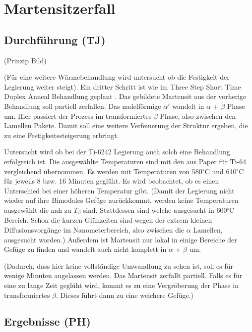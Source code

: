 \chapter{Martensitzerfall}

\section{Durchführung (TJ)}

(Prinzip Bild)


(Für eine weitere Wärmebehandlung wird untersucht ob die Festigkeit der Legierung weiter steigt). Ein dritter Schritt ist wie im Three Step Short Time Duplex Anneal Behandlung geplant \cite{Morita.2005}. Das gebildete Martensit aus der vorherige Behandlung soll partiell zerfallen. Das nadelförmige $\alpha'$ wandelt in $\alpha$ + $\beta$ Phase um. Hier passiert der Prozess im transformiertes $\beta$ Phase, also zwischen den Lamellen Pakete. Damit soll eine weitere Verfeinerung der Struktur ergeben, die zu eine Festigkeitssteigerung erbringt.

Untersucht wird ob bei der Ti-6242 Legierung auch solch eine Behandlung erfolgreich ist. Die ausgewählte Temperaturen sind mit den aus  Paper für Ti-64 \cite{Morita.2005} vergleichend übernommen. Es werden mit Temperaturen von 580$^\circ$C und 610$^\circ$C für jeweils 8 bzw. 16 Minuten geglüht. Es wird beobachtet, ob es einen Unterschied bei einer höheren Temperatur gibt.  (Damit der Legierung nicht wieder auf ihre Bimodales Gefüge zurückkommt, werden keine Temperaturen ausgewählt die nah zu $T_{\beta}$ sind. Stattdessen sind welche ausgesucht in 600$^\circ$C Bereich. Schon die kurzen Glühzeiten sind wegen der extrem kleinen Diffusionsvorgänge im Nanometerbereich, also zwischen die $\alpha$ Lamellen, ausgesucht worden.) Außerdem ist Martensit nur lokal in einige Bereiche der Gefüge zu finden und wandelt auch nicht komplett in $\alpha$ + $\beta$ um.

(Dadurch, dass hier keine vollständige Umwandlung zu sehen ist, soll es für wenige Minuten angelassen werden. Das Martensit zerfallt partiell. Falls es für eine zu lange Zeit geglüht wird, kommt es zu eine Vergröberung der Phase in transformiertes $\beta$. Dieses führt dann zu eine weichere Gefüge.)



\section{Ergebnisse (PH)}

